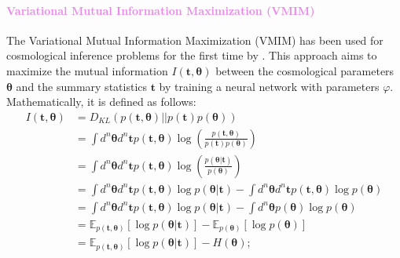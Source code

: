 \documentclass{aa}
\begin{document}
\paragraph{\textcolor{violet}{Variational Mutual Information Maximization (VMIM)}}
The Variational Mutual Information Maximization (VMIM) has been used for cosmological inference problems for the first time by \citet{jeffrey2021likelihood}. This approach aims to maximize the mutual information $I(\bm{t}, \bm {\theta})$ between the cosmological parameters $\bm{\theta}$ and the summary statistics $\bm t$ by training a neural network with parameters $\varphi$. 
Mathematically, it is defined as follows:
\begin{align}\label{Eq:mutual_information}
    I(\bm{t}, \bm {\theta}) &= D_{KL}(p(\bm {t}, \bm {\theta})||p(\bm {t})p(\bm {\theta})) \\ \nonumber
    &= \int d^n \bm{\theta} d^n \bm{t} p(\bm t, \bm \theta)\log{\left( \frac{ p(\bm {t}, \bm {\theta})}{ p(\bm {t}) p(\bm {\theta})} \right)} \\ \nonumber
    &= \int d^n \bm{\theta} d^n \bm{t} p(\bm t, \bm {\theta})\log{\left( \frac{ p(\bm {\theta} | \bm {t} )}{ p(\bm {\theta})} \right)} \\ \nonumber
        &= \int d^n \bm{\theta} d^n \bm{t} p(\bm t, \bm {\theta})\log{p(\bm {\theta} | \bm {t} )} - \int d^n \bm{\theta}  d^n \bm{t} p(\bm t, \bm {\theta})\log{p(\bm {\theta})} \\ \nonumber
    &= \int d^n \bm{\theta} d^n \bm{t} p(\bm t, \bm {\theta})\log{p(\bm {\theta} | \bm {t} )} - \int d^n \bm{\theta} p(\bm {\theta})\log{p(\bm {\theta})} \\ \nonumber
    &= \mathbb{E}_{p(\bm {t}, \bm {\theta})} [\log{p(\bm {\theta} | \bm {t} )}]- \mathbb{E}_{p(\bm {\theta})} [\log{p(\bm {\theta})}] \\ \nonumber
    &= \mathbb{E}_{p(\bm {t}, \bm {\theta})} [\log{p(\bm {\theta} | \bm {t} )}]- H(\bm {\theta});
\end{align}
\end{document}
